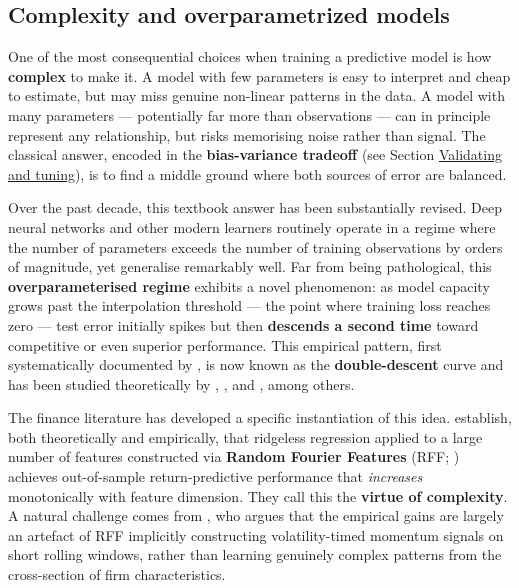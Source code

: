 \subsection{Complexity and overparametrized models}

One of the most consequential choices when training a predictive model is how \textbf{complex} to make it. A model with few parameters is easy to interpret and cheap to estimate, but may miss genuine non-linear patterns in the data. A model with many parameters --- potentially far more than observations --- can in principle represent any relationship, but risks memorising noise rather than signal. The classical answer, encoded in the \textbf{bias-variance tradeoff} (see Section \href{/chap-13-validating-tuning}{Validating and tuning}), is to find a middle ground where both sources of error are balanced.

Over the past decade, this textbook answer has been substantially revised. Deep neural networks and other modern learners routinely operate in a regime where the number of parameters exceeds the number of training observations by orders of magnitude, yet generalise remarkably well. Far from being pathological, this \textbf{overparameterised regime} exhibits a novel phenomenon: as model capacity grows past the interpolation threshold --- the point where training loss reaches zero --- test error initially spikes but then \textbf{descends a second time} toward competitive or even superior performance. This empirical pattern, first systematically documented by \cite{belkin2019reconciling}, is now known as the \textbf{double-descent} curve and has been studied theoretically by \cite{bartlett2020benign}, \cite{belkin2020two}, and \cite{hastie2022surprises}, among others.

The finance literature has developed a specific instantiation of this idea. \cite{kelly2024virtue} establish, both theoretically and empirically, that ridgeless regression applied to a large number of features constructed via \textbf{Random Fourier Features} (RFF; \cite{rahimi2007random}) achieves out-of-sample return-predictive performance that \textit{increases} monotonically with feature dimension. They call this the \textbf{virtue of complexity}. A natural challenge comes from \cite{nagel2025seemingly}, who argues that the empirical gains are largely an artefact of RFF implicitly constructing volatility-timed momentum signals on short rolling windows, rather than learning genuinely complex patterns from the cross-section of firm characteristics.

